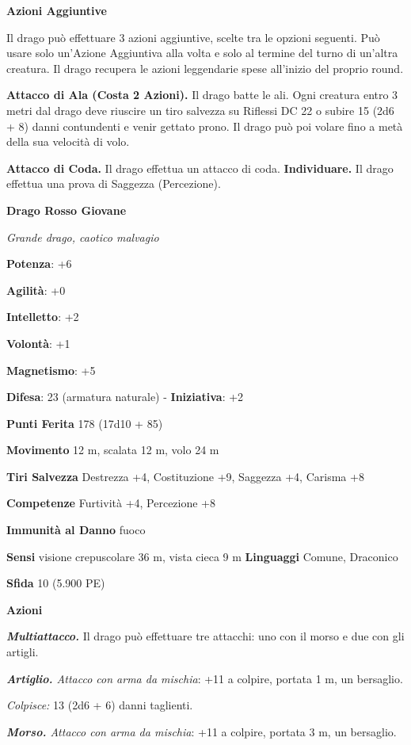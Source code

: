 \begin{multicols}{2}
\textbf{Azioni Aggiuntive}

Il drago può effettuare 3 azioni aggiuntive, scelte tra le opzioni
seguenti. Può usare solo un'Azione Aggiuntiva alla volta e solo al
termine del turno di un'altra creatura. Il drago recupera le azioni
leggendarie spese all'inizio del proprio round.

\textbf{Attacco di Ala (Costa 2 Azioni).} Il drago batte le ali. Ogni
creatura entro 3 metri dal drago deve riuscire un tiro salvezza su Riflessi DC 22 o subire 15 (2d6 + 8) danni contundenti e venir gettato
prono. Il drago può poi volare fino a metà della sua velocità di volo.

\textbf{Attacco di Coda.} Il drago effettua un attacco di coda.
\textbf{Individuare.} Il drago effettua una prova di Saggezza
(Percezione).



\textbf{Drago Rosso Giovane}

\emph{Grande drago, caotico malvagio}

\textbf{Potenza}: +6

\textbf{Agilità}: +0

\textbf{Intelletto}: +2

\textbf{Volontà}: +1

\textbf{Magnetismo}: +5

\textbf{Difesa}: 23 (armatura naturale) - \textbf{Iniziativa}: +2

\textbf{Punti Ferita} 178 (17d10 + 85)

\textbf{Movimento} 12 m, scalata 12 m, volo 24 m

\textbf{Tiri Salvezza} Destrezza +4, Costituzione +9, Saggezza +4,
Carisma +8

\textbf{Competenze} Furtività +4, Percezione +8

\textbf{Immunità al Danno} fuoco

\textbf{Sensi} visione crepuscolare 36 m, vista cieca 9 m
\textbf{Linguaggi} Comune, Draconico

\textbf{Sfida} 10 (5.900 PE)\smallskip

\smallskip\textbf{Azioni}

\emph{\textbf{Multiattacco.}} Il drago può effettuare tre attacchi: uno
con il morso e due con gli artigli.

\emph{\textbf{Artiglio.} Attacco con arma da mischia}: +11 a colpire,
portata 1 m, un bersaglio.

\emph{Colpisce:} 13 (2d6 + 6) danni taglienti.

\emph{\textbf{Morso.} Attacco con arma da mischia}: +11 a colpire,
portata 3 m, un bersaglio.


\end{multicols}
